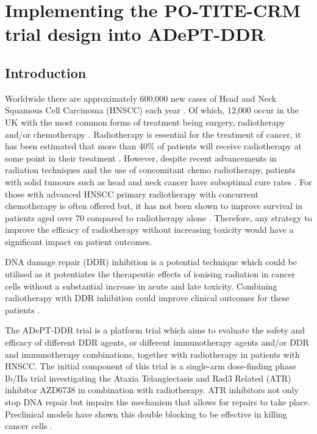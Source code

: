 
\chapter{Implementing the PO-TITE-CRM trial design into ADePT-DDR} %

\label{Chapter2} %


\section{Introduction}

Worldwide there are approximately 600,000 new cases of Head and Neck Squamous Cell Carcinoma (HNSCC) each year \cite{stranskyMutationalLandscapeHead2011}. Of which, 12,000 occur in the UK with the most common forms of treatment being surgery, radiotherapy and/or chemotherapy \cite{cancerreaserchukHeadNeckCancers2017}. Radiotherapy is essential for the treatment of cancer, it has been estimated that more than 40\% of patients will receive radiotherapy at some point in their treatment \cite{roundRadiotherapyDemandActivity2013}. However, despite recent advancements in radiation techniques and the use of concomitant chemo radiotherapy, patients with solid tumours such as head and neck cancer have suboptimal cure rates \cite{cancerreaserchukHeadNeckCancers2017,cognettiHeadNeckCancer2008}. For those with advanced HNSCC primary radiotherapy with concurrent chemotherapy is often offered but, it has not been shown to improve survival in patients aged over 70 compared to radiotherapy alone \cite{pignonChemotherapyAddedLocoregional2000}. Therefore, any strategy to improve the efficacy of radiotherapy without increasing toxicity would have a significant impact on patient outcomes. 

DNA damage repair (DDR) inhibition is a potential technique which could be utilised as it potentiates the therapeutic effects of ionising radiation in cancer cells without a substantial increase in acute and late toxicity. Combining radiotherapy with DDR inhibition could improve clinical outcomes for these patients \cite{chalmersScienceFocusCombining2016}.  

The ADePT-DDR trial is a platform trial which aims to evaluate the safety and efficacy of different DDR agents, or different immunotherapy agents and/or DDR and immunotherapy combinations, together with radiotherapy in patients with HNSCC. The initial component of this trial is a single-arm dose-finding phase \RN{1}b/\RN{2}a trial investigating the Ataxia Telangiectasis and Rad3 Related (ATR) inhibitor AZD6738 in combination with radiotherapy. ATR inhibitors not only stop DNA repair but impairs the mechanism that allows for repairs to take place. Preclinical models have shown this double blocking to be effective in killing cancer cells \cite{meiAtaxiaTelangiectasiaRad3related2019}. 

